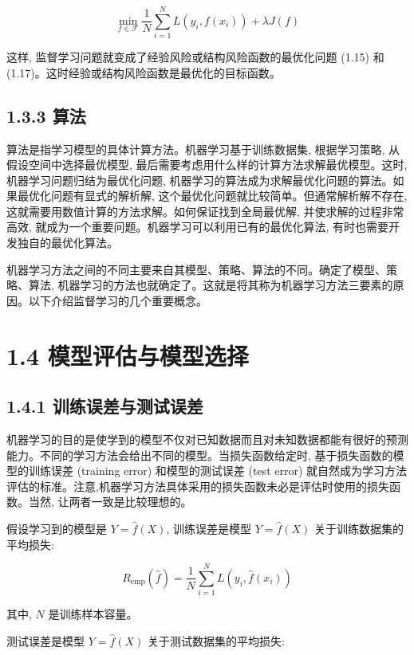 \documentclass[10pt]{article}
\begin{document}
\begin{CJK*}{UTF8}{bsmi}
\begin{equation*}
\min _{f \in \mathcal{F}} \frac{1}{N} \sum_{i=1}^{N} L\left(y_{i}, f\left(x_{i}\right)\right)+\lambda J(f) \tag{1.17}
\end{equation*}


这样, 监督学习问题就变成了经验风险或结构风险函数的最优化问题 (1.15) 和 (1.17)。这时经验或结构风险函数是最优化的目标函数。

\subsection*{1.3.3 算法}
算法是指学习模型的具体计算方法。机器学习基于训练数据集, 根据学习策略, 从假设空间中选择最优模型, 最后需要考虑用什么样的计算方法求解最优模型。这时, 机器学习问题归结为最优化问题, 机器学习的算法成为求解最优化问题的算法。如果最优化问题有显式的解析解, 这个最优化问题就比较简单。但通常解析解不存在, 这就需要用数值计算的方法求解。如何保证找到全局最优解, 并使求解的过程非常高效, 就成为一个重要问题。机器学习可以利用已有的最优化算法, 有时也需要开发独自的最优化算法。

机器学习方法之间的不同主要来自其模型、策略、算法的不同。确定了模型、策略、算法, 机器学习的方法也就确定了。这就是将其称为机器学习方法三要素的原因。以下介绍监督学习的几个重要概念。

\section*{1.4 模型评估与模型选择}
\subsection*{1.4.1 训练误差与测试误差}
机器学习的目的是使学到的模型不仅对已知数据而且对未知数据都能有很好的预测能力。不同的学习方法会给出不同的模型。当损失函数给定时, 基于损失函数的模型的训练误差 (training error) 和模型的测试误差 (test error) 就自然成为学习方法评估的标准。注意,机器学习方法具体采用的损失函数未必是评估时使用的损失函数。当然, 让两者一致是比较理想的。

假设学习到的模型是 $Y=\hat{f}(X)$, 训练误差是模型 $Y=\hat{f}(X)$ 关于训练数据集的平均损失:


\begin{equation*}
R_{\mathrm{emp}}(\hat{f})=\frac{1}{N} \sum_{i=1}^{N} L\left(y_{i}, \hat{f}\left(x_{i}\right)\right) \tag{1.18}
\end{equation*}


其中, $N$ 是训练样本容量。

测试误差是模型 $Y=\hat{f}(X)$ 关于测试数据集的平均损失:



\end{CJK*}
\end{document}
